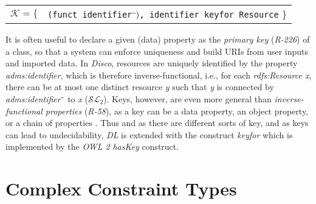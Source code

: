 \documentclass{llncs}
\newcommand{\ms}[1]{\texttt{#1}}
\newenvironment{DL}{
  \small
  \vspace{0cm}
	\begin{center}
  \begin{tabular}{c l}

}{
  \end{tabular}
	\end{center}
}
\begin{document}
{{\begin{center}
\begin{DL} 
$\mathcal{K}=\{$ 
	&\ms{(funct identifier$\sp{\overline{\ }})$, identifier keyfor Resource}
 \}\\ 
\end{DL}
\end{center}

It is often useful to declare a given (data) property as the \emph{primary key} (\emph{R-226}) of a class, so that a system can enforce uniqueness and build URIs from user inputs and imported data. 
In \emph{Disco}, resources are uniquely identified by the property \emph{adms:identifier},
which is therefore inverse-functional,
i.e., for each \emph{rdfs:Resource x}, there can be at most one distinct resource \emph{y} such that \emph{y} is connected by \emph{adms:identifier$\sp{\overline{\ }}$} to \emph{x} ($\mathcal{SL}_{2}$).
Keys, however, are even more general than \emph{inverse-functional properties} (\emph{R-58}),
as a key can be a data property, an object property, or a chain of properties \cite{Schneider2009}.
Thus and as there are different sorts of key, and as keys can lead to undecidability, 
\emph{DL} is extended with the construct \emph{keyfor} \cite{Lutz2005} which is implemented by the \emph{OWL 2} \emph{hasKey} construct.

\section{Complex Constraint Types}
\label{complex-constraint-types}


}}
\end{document}
